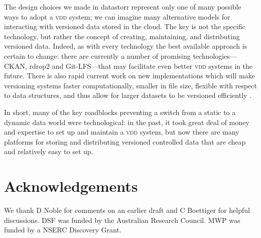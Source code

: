 \documentclass[a4paper,11pt]{article}
\begin{document}




\noindent\makebox[\linewidth]{\rule{\paperwidth}{0.4pt}}


The design choices we made in datastorr represent only one of many possible ways to adopt a \textsc{vdd} system; we can imagine many alternative models for interacting with versioned data stored in the cloud. The key is not the specific technology, but rather the concept of creating, maintaining, and distributing versioned data.  Indeed, as with every technology the best available approach is certain to change: there are currently a number of promising technologies---CKAN, rdrop2 and Git-LFS---that may facilitate even better \textsc{vdd} systems in the future.  There is also rapid current work on new implementations which will make versioning systems faster computationally, smaller in file size, flexible with respect to data structures, and thus allow for larger datasets to be versioned efficiently \citep{Fli, Dat}. 

In short, many of the key roadblocks preventing a switch from a static to a dynamic data world were technological: in the past, it took great deal of money and expertise to set up and maintain a \textsc{vdd} system, but now there are many platforms for storing and distributing versioned controlled data that are cheap and relatively easy to set up. 


\section{Acknowledgements}
We thank D Noble for comments on an earlier draft and C Boettiger for helpful discussions. DSF was funded by the Australian Research Council. MWP was funded by a NSERC Discovery Grant.
\end{document}
